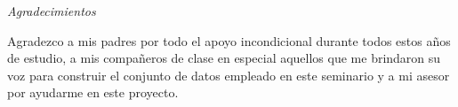 \documentclass[12pt,spanish, singlespacing,]{MastersDoctoralThesis}
\newcommand\blankpage{%
    \null
    \thispagestyle{empty}%
    \addtocounter{page}{0}%
    \newpage}
\begin{document}
\newpage
\begin{center}
{\huge \textit{Agradecimientos}}\\[1.5cm]
\end{center}

Agradezco a mis padres por todo el apoyo incondicional durante todos estos años de estudio, a mis compañeros de clase en especial aquellos que me brindaron su voz para construir el conjunto de datos empleado en este seminario y a mi asesor por ayudarme en este proyecto.



\afterpage{\blankpage}

\mainmatter 
\pagestyle{thesis}	


$\ $

$\ $

$\ $






\afterpage{\blankpage}
\appendix

\end{document}
